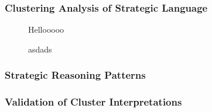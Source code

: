 \subsubsection*{Clustering Analysis of Strategic Language}

\begin{figure}[htpb!]
    \centering
    
    \caption{Hellooooo}\label{fig:relative_prevalence_clusters}
\end{figure}



\begin{figure}[htpb!]
    \centering
    
    \caption{asdads}\label{fig:asdasd}
\end{figure}



\subsubsection*{Strategic Reasoning Patterns}


\subsubsection*{Validation of Cluster Interpretations}





